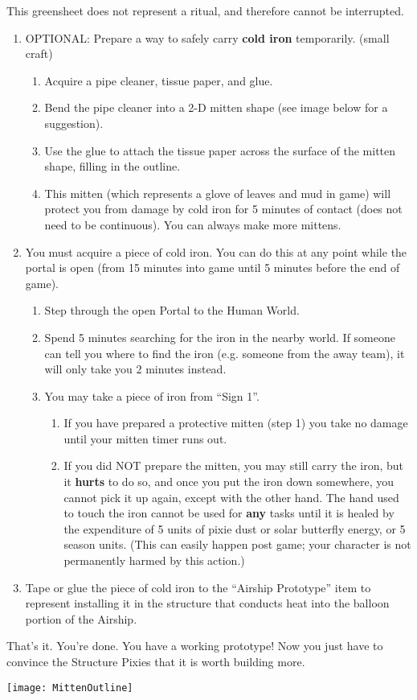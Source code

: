 \documentclass[green]{PP}
\begin{document}
\name{\gAirship{}}
This greensheet does not represent a ritual, and therefore cannot be interrupted.

\begin{enumerate}
	\item OPTIONAL: Prepare a way to safely carry \textbf{cold iron} temporarily. (small craft)
	\begin{enumerate}
		\item Acquire a pipe cleaner, tissue paper, and glue.
		\item Bend the pipe cleaner into a 2-D mitten shape (see image below for a suggestion).
		\item Use the glue to attach the tissue paper across the surface of the mitten shape, filling in the outline.
		\item This mitten (which represents a glove of leaves and mud in game) will protect you from damage by cold iron for 5 minutes of contact (does not need to be continuous). You can always make more mittens.
	\end{enumerate}
	\item You must acquire a piece of cold iron. You can do this at any point while the portal is open (from 15 minutes into game until 5 minutes before the end of game).
	\begin{enumerate}
		\item Step through the open Portal to the Human World.
		\item Spend 5 minutes searching for the iron in the nearby world. If someone can tell you where to find the iron (e.g. someone from the away team), it will only take you 2 minutes instead.
		\item You may take a piece of iron from “Sign 1”.
		\begin{enumerate}
			\item If you have prepared a protective mitten (step 1) you take no damage until your mitten timer runs out.
			\item If you did NOT prepare the mitten, you may still carry the iron, but it \textbf{hurts} to do so, and once you put the iron down somewhere, you cannot pick it up again, except with the other hand. The hand used to touch the iron cannot be used for \textbf{any} tasks until it is healed by the expenditure of 5 units of pixie dust or solar butterfly energy, or 5 season units. (This can easily happen post game; your character is not permanently harmed by this action.)
		\end{enumerate}
	\end{enumerate}
	\item Tape or glue the piece of cold iron to the “Airship Prototype” item to represent installing it in the structure that conducts heat into the balloon portion of the Airship.
\end{enumerate}

That’s it. You’re done. You have a working prototype! Now you just have to convince the Structure Pixies that it is worth building more.

\texttt{[image: MittenOutline]}
\end{document}

